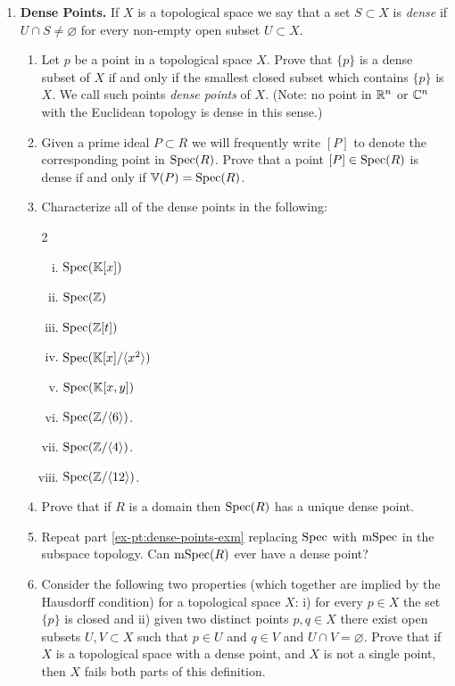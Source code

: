 \documentclass[12pt,reqno]{amsart}
\begin{document}
\begin{enumerate}[leftmargin=*]
\item \textbf{Dense Points.} If $X$ is a topological space we say that a set $S \subset X$ is \emph{dense} if $U\cap S \neq \varnothing$ for every non-empty open subset $U \subset X$. 
\begin{enumerate}[label=(\alph*),ref=\theenumi\alph*]
	\item Let $p$ be a point in a topological space $X$. Prove that  $\{p\}$ is a dense subset of $X$ if and only if the smallest closed subset which contains $\{p\}$ is $X$. We call such points \emph{dense points} of $X$. (Note: no point in $\mathbb{R}^n$ or $\mathbb{C}^n$ with the Euclidean topology is dense in this sense.)
	\item Given a prime ideal $P \subset R$ we will frequently write $[P]$ to denote the corresponding point in $\operatorname{Spec}(R)$. Prove that a point $[P] \in \operatorname{Spec}(R)$ is dense if and only if $\mathbb{V}(P) = \operatorname{Spec}(R)$.
	\item\label{ex-pt:dense-points-exm} Characterize all of the dense points in the following: 
		\begin{multicols}{2}
		\begin{enumerate}[(i)]
			\item $\operatorname{Spec}(\mathbb{K}[x])$
			\item $\operatorname{Spec}(\mathbb{Z})$
			\item $\operatorname{Spec}(\mathbb{Z}[t])$
			\item $\operatorname{Spec}(\mathbb{K}[x]/\langle x^{2}\rangle)$
			\item $\operatorname{Spec}(\mathbb{K}[x,y])$
			\item $\operatorname{Spec}(\mathbb{Z}/\langle 6\rangle)$.
			\item $\operatorname{Spec}(\mathbb{Z}/\langle 4\rangle)$.
			\item $\operatorname{Spec}(\mathbb{Z}/\langle 12\rangle)$.
		\end{enumerate}
		\end{multicols}
	\item Prove that if $R$ is a domain then $\operatorname{Spec}(R)$ has a unique dense point. 
	\item Repeat part \ref{ex-pt:dense-points-exm} replacing $\operatorname{Spec}$ with $\operatorname{mSpec}$ in the subspace topology. Can $\operatorname{mSpec}(R)$ ever have a dense point?
	\item Consider the following two properties (which together are implied by the Hausdorff condition) for a topological space $X$: i) for every $p \in X$ the set $\{p\}$ is closed and ii) given two distinct points $p,q\in X$ there exist open subsets $U,V \subset X$ such that $p \in U$ and $q \in V$ and $U\cap V = \varnothing$. Prove that if $X$ is a topological space with a dense point, and $X$ is not a single point, then $X$ fails both parts of this definition. 
	\end{enumerate}


\end{enumerate}
\end{document}
